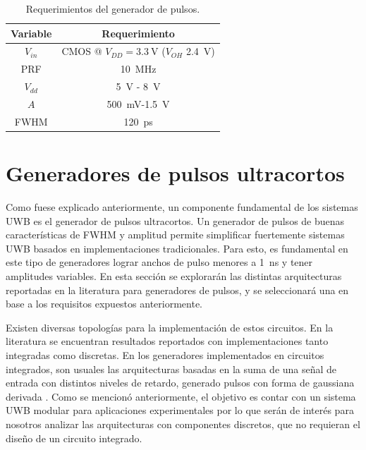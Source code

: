 \begin{table}
\centering
\begin{tabular}{c|c}
\hline
    Variable & Requerimiento \\
\hline
    $V_{in}$                &   CMOS @ $V_{DD}=\qty{3.3}{\volt}$ ($V_{OH}$
    \qty{2.4}{\volt})     \\
    PRF                &        \qty{10}{\mega\hertz} \\
    $V_{dd}$                &   \qty{5}{\volt} - \qty{8}{\volt} \\
    $A$                &        \qty{500}{\milli\volt}-\qty{1.5}{\volt} \\
    FWHM                &       \qty{120}{\pico\second} \\
\hline
\end{tabular}
\caption{Requerimientos del generador de pulsos.}
\label{tab:pulser_requirements}
\end{table}

\section{Generadores de pulsos ultracortos}

Como fuese explicado anteriormente, un componente fundamental de los sistemas
UWB es el generador de pulsos ultracortos. Un generador de pulsos de buenas
características de FWHM y amplitud permite simplificar fuertemente sistemas UWB
basados en implementaciones tradicionales. Para esto, es fundamental en este tipo
de generadores lograr anchos de pulso menores a \qty{1}{\nano\second} y tener
amplitudes variables. En esta sección se explorarán las distintas arquitecturas
reportadas en la literatura para generadores de pulsos, y se seleccionará una en
base a los requisitos expuestos anteriormente.

Existen diversas topologías para la implementación de estos circuitos. En la
literatura se encuentran resultados reportados con implementaciones tanto
integradas como discretas. En los generadores implementados en circuitos
integrados, son usuales las arquitecturas basadas en la suma de una señal de
entrada con distintos niveles de retardo, generado pulsos con forma de gaussiana
derivada \cite{Nguyen2012} \cite{Salehi2010} \cite{An2018}. Como se mencionó
anteriormente, el objetivo es contar con un sistema UWB modular para
aplicaciones experimentales por lo que serán de interés para nosotros analizar
las arquitecturas con componentes discretos, que no requieran el diseño de un
circuito integrado.

